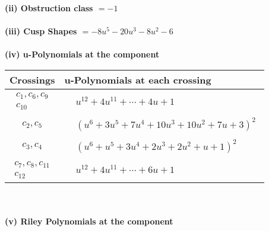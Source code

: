 \documentclass[1p]{elsarticle_modified}
\theoremstyle{definition}
\begin{document}
\flushleft \textbf{(ii) Obstruction class $= -1$}\\~\\
\flushleft \textbf{(iii) Cusp Shapes $= -8 u^5-20 u^3-8 u^2-6$}\\~\\
\newpage\renewcommand{\arraystretch}{1}
\flushleft \textbf{(iv) u-Polynomials at the component}\newline \\
\begin{tabular}{m{50pt}|m{274pt}}
Crossings & \hspace{64pt}u-Polynomials at each crossing \\
\hline $$\begin{aligned}c_{1},c_{6},c_{9}\\c_{10}\end{aligned}$$&$\begin{aligned}
&u^{12}+4 u^{11}+\cdots+4 u+1
\end{aligned}$\\
\hline $$\begin{aligned}c_{2},c_{5}\end{aligned}$$&$\begin{aligned}
&(u^6+3 u^5+7 u^4+10 u^3+10 u^2+7 u+3)^2
\end{aligned}$\\
\hline $$\begin{aligned}c_{3},c_{4}\end{aligned}$$&$\begin{aligned}
&(u^6+u^5+3 u^4+2 u^3+2 u^2+u+1)^2
\end{aligned}$\\
\hline $$\begin{aligned}c_{7},c_{8},c_{11}\\c_{12}\end{aligned}$$&$\begin{aligned}
&u^{12}+4 u^{11}+\cdots+6 u+1
\end{aligned}$\\
\hline
\end{tabular}\\~\\
\newpage\renewcommand{\arraystretch}{1}
\flushleft \textbf{(v) Riley Polynomials at the component}\newline \\
\end{document}
